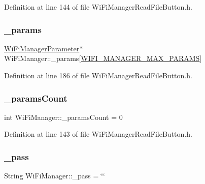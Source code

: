 Definition at line 144 of file Wi\+Fi\+Manager\+Read\+File\+Button.\+h.

\mbox{\label{class_wi_fi_manager_a355ce9bbaab94baffd1c83de9b166fea}} 
\subsubsection{\texorpdfstring{\+\_\+params}{\_params}}
{\footnotesize\ttfamily \hyperlink{class_wi_fi_manager_parameter}{Wi\+Fi\+Manager\+Parameter}$\ast$ Wi\+Fi\+Manager\+::\+\_\+params\mbox{[}\hyperlink{_wi_fi_manager_read_file_button_8h_a5a8c6577015e3b2e82cf4bdab1475310}{W\+I\+F\+I\+\_\+\+M\+A\+N\+A\+G\+E\+R\+\_\+\+M\+A\+X\+\_\+\+P\+A\+R\+A\+MS}\mbox{]}\hspace{0.3cm}{\ttfamily [private]}}



Definition at line 186 of file Wi\+Fi\+Manager\+Read\+File\+Button.\+h.

\mbox{\label{class_wi_fi_manager_a22e803d23ae77cb611914445db17c9b6}} 
\subsubsection{\texorpdfstring{\+\_\+params\+Count}{\_paramsCount}}
{\footnotesize\ttfamily int Wi\+Fi\+Manager\+::\+\_\+params\+Count = 0\hspace{0.3cm}{\ttfamily [private]}}



Definition at line 143 of file Wi\+Fi\+Manager\+Read\+File\+Button.\+h.

\mbox{\label{class_wi_fi_manager_a7486c2c0b67884ea872a4fe56d3450b2}} 
\subsubsection{\texorpdfstring{\+\_\+pass}{\_pass}}
{\footnotesize\ttfamily String Wi\+Fi\+Manager\+::\+\_\+pass = \char`\"{}\char`\"{}\hspace{0.3cm}{\ttfamily [private]}}



